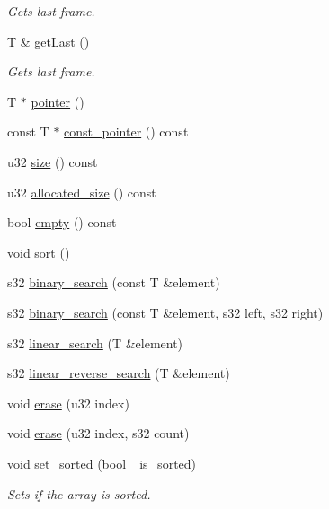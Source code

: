 \begin{DoxyCompactItemize}
\begin{DoxyCompactList}\small\item\em Gets last frame. \end{DoxyCompactList}\item 
\hypertarget{classirr_1_1core_1_1array_a142e1833faabec2b7578557fd12e72c2}{T \& \hyperlink{classirr_1_1core_1_1array_a142e1833faabec2b7578557fd12e72c2}{get\+Last} ()}\label{classirr_1_1core_1_1array_a142e1833faabec2b7578557fd12e72c2}

\begin{DoxyCompactList}\small\item\em Gets last frame. \end{DoxyCompactList}\item 
T $\ast$ \hyperlink{classirr_1_1core_1_1array_afe5fd668b288ea14a585144c62d99c03}{pointer} ()
\item 
const T $\ast$ \hyperlink{classirr_1_1core_1_1array_abf62c8ec9581f618a4412721568b349e}{const\+\_\+pointer} () const 
\item 
u32 \hyperlink{classirr_1_1core_1_1array_ad63ccc83da39943532c7af164c7b7bcf}{size} () const 
\item 
u32 \hyperlink{classirr_1_1core_1_1array_a3291d7ce05c97ce6acf794f53718df63}{allocated\+\_\+size} () const 
\item 
bool \hyperlink{classirr_1_1core_1_1array_a80b1c057a23ab3d3ca84db8737659943}{empty} () const 
\item 
void \hyperlink{classirr_1_1core_1_1array_ad25908968e87d8c6a43f36a7143bc10b}{sort} ()
\item 
s32 \hyperlink{classirr_1_1core_1_1array_a225b3bcb55293f18b90e069a979e44c6}{binary\+\_\+search} (const T \&element)
\item 
s32 \hyperlink{classirr_1_1core_1_1array_a995506f4a479910947ebbf74a939aed4}{binary\+\_\+search} (const T \&element, s32 left, s32 right)
\item 
s32 \hyperlink{classirr_1_1core_1_1array_a917e0d2690b9871d2d13d9ec0a3626f5}{linear\+\_\+search} (T \&element)
\item 
s32 \hyperlink{classirr_1_1core_1_1array_a4efb7d86fc42e6b29e932f983d6ffae0}{linear\+\_\+reverse\+\_\+search} (T \&element)
\item 
void \hyperlink{classirr_1_1core_1_1array_aa28ffba81d9af68bdc76fb2df1e10428}{erase} (u32 index)
\item 
void \hyperlink{classirr_1_1core_1_1array_a2b749c99e727919254f1f0593fbd30ed}{erase} (u32 index, s32 count)
\item 
\hypertarget{classirr_1_1core_1_1array_a5322149d943e3a5b23dff3000f825a01}{void \hyperlink{classirr_1_1core_1_1array_a5322149d943e3a5b23dff3000f825a01}{set\+\_\+sorted} (bool \+\_\+is\+\_\+sorted)}\label{classirr_1_1core_1_1array_a5322149d943e3a5b23dff3000f825a01}

\begin{DoxyCompactList}\small\item\em Sets if the array is sorted. \end{DoxyCompactList}\end{DoxyCompactItemize}


